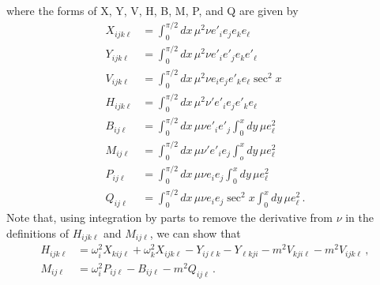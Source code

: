 \documentclass[letterpaper,11pt]{article}
\newcommand{\oi}{\omega_i}
\newcommand{\ok}{\omega_k}
\begin{document}
where the forms of X, Y, V, H, B, M, P, and Q are given by
\begin{align}
X_{ijk\ell} &= \int^{\pi/2}_0 dx \, \mu^2 \nu e'_i e_j e_k e_\ell \\
Y_{ijk\ell} &= \int^{\pi/2}_0 dx \, \mu^2 \nu e'_i e'_j e_k e'_\ell \\
V_{ijk\ell} &= \int^{\pi/2}_0 dx \, \mu^2 \nu e_i e_j e'_k e_\ell \sec^2 x \\
H_{ijk\ell} &= \int^{\pi/2}_0 dx \, \mu^2 \nu' e'_i e_j e'_k e_\ell \\
B_{ij\ell} &= \int^{\pi/2}_0 dx \, \mu \nu e'_i e'_j \int^x_0 dy \, \mu e^2_\ell \\
M_{ij\ell} &= \int^{\pi/2}_0 dx \, \mu \nu' e'_i e_j \int^x_o dy \, \mu e_\ell^2 \\
P_{ij\ell} &= \int^{\pi/2}_0 dx \, \mu \nu e_i e_j \int^x_0 dy \, \mu e^2_\ell \\
Q_{ij\ell} &= \int^{\pi/2}_0 dx \, \mu \nu e_i e_j \sec^2 x \int^x_0 dy \, \mu e^2_\ell \, .
\end{align}
Note that, using integration by parts to remove the derivative from $\nu$ in the definitions of $H_{ijk\ell}$ and $M_{ij\ell}$, we can show that
\begin{align}
H_{ijk\ell} &= \oi^2 X_{kij\ell} + \ok^2 X_{ijk\ell} - Y_{ij\ell k}  - Y_{\ell kji}   - m^2 V_{kji\ell} -m^2 V_{ijk\ell} \, , \\
M_{ij\ell} &= \oi^2 P_{ij\ell} - B_{ij\ell} -m^2 Q_{ij\ell} \, .
\end{align}
\end{document}

